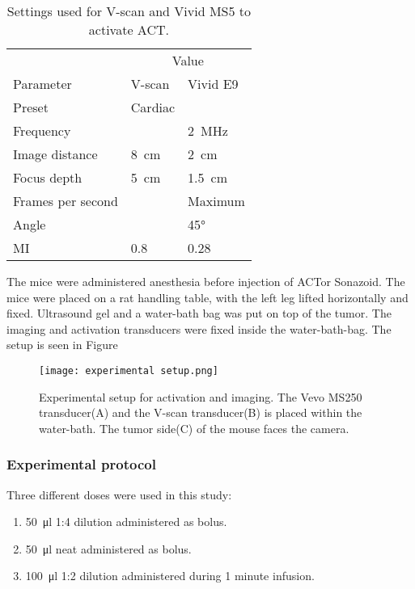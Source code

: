  
\begin{table}[htb]
\label{tab:V-scan vivid}
\caption{Settings used for V-scan and Vivid MS5 to activate ACT\textregistered.}
\begin{center}
\begin{tabular}{@{}l l l @{}}\toprule
& \multicolumn{2}{c}{Value} \\ \cmidrule(r){2-3}
Parameter & V-scan & Vivid E9\\
\midrule
Preset & Cardiac & \\
Frequency & & \SI{2}{\mega\hertz}\\
Image distance & \SI{8}{\centi\meter} & \SI{2}{\centi\meter}\\
Focus depth & \SI{5}{\centi\meter} & \SI{1.5}{\centi\meter}\\
Frames per second & &Maximum\\
Angle & & \ang{45}\\
MI & \num{0.8} & \num{0.28} \\
  \bottomrule
\end{tabular}
\end{center}
\end{table}

The mice were administered anesthesia before injection of ACT\textregistered or Sonazoid\texttrademark. The mice were placed on a rat handling table, with the left leg lifted horizontally and fixed. Ultrasound gel and a water-bath bag was put on top of the tumor. The imaging and activation transducers were fixed inside the water-bath-bag. The setup is seen in Figure

\begin{figure}[h]
  \centering
  \label{Fig:setup}
  \texttt{[image: experimental setup.png]}
  \caption{Experimental setup for activation and imaging. The Vevo MS250 transducer(A) and the V-scan transducer(B) is placed within the water-bath. The tumor side(C) of the mouse faces the camera.}
\end{figure}



\subsubsection{Experimental protocol}
Three different doses were used in this study:

\begin{enumerate}
  \item \SI{50}{\micro\litre} 1:4 dilution administered as bolus.
  \item \SI{50}{\micro\litre} neat administered as bolus.
  \item \SI{100}{\micro\litre} 1:2 dilution administered during 1 minute infusion.
\end{enumerate}
 
